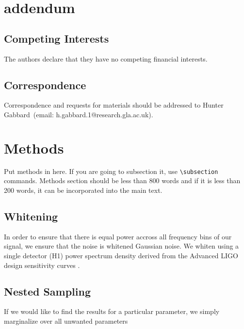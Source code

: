 \documentclass[%
showpacs,
 amsmath,amssymb,
 aps,
 twocolumn,
 prl,
 reprint,
floatfix,
]{revtex4-1}
\begin{document}

\section{addendum}
 \subsection{Competing Interests} 
    The authors declare that they have no competing financial interests.
 \subsection{Correspondence} Correspondence and requests for materials should be addressed to Hunter Gabbard~(email: h.gabbard.1@research.gla.ac.uk).

\section{Methods}
%
Put methods in here.  If you are going to subsection it, use
\verb|\subsection| commands.  Methods section should be less than
800 words and if it is less than 200 words, it can be incorporated
into the main text.

\subsection{Whitening} \label{whiten_sec}

In order to ensure 
that there is equal power accross all
frequency bins of our signal, we ensure that the noise is whitened Gaussian
noise. We whiten using a single detector (H1) power spectrum density derived from the
Advanced LIGO design sensitivity curves \cite{2016LRR....19....1A}. 

\subsection{Nested Sampling} \label{nested_sec}
%
%
If we would like to find the results for a particular parameter, 
we simply marginalize over all unwanted parameters 
\end{document}
